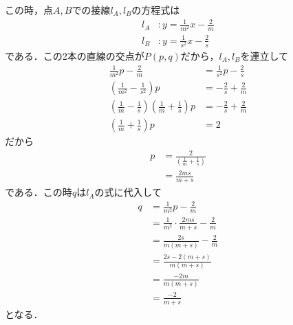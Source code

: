 \documentclass[a4paper,10pt]{ltjsarticle}
\begin{document}
\begin{multicols}{2}
  この時，点$A,B$での接線$l_A,l_B$の方程式は
  \begin{align*}
    l_A & : y = \frac{1}{m^2}x - \frac{2}{m} \\
    l_B & : y = \frac{1}{s^2}x - \frac{2}{s}
  \end{align*}
  である．この2本の直線の交点が$P(p,q)$だから，$l_A, l_B$を連立して
  \begin{align*}
    \frac{1}{m^2}p - \frac{2}{m}                                               & = \frac{1}{s^2}p - \frac{2}{s} \\
    \left(\frac{1}{m^2}-\frac{1}{s^2}\right) p                                 & = -\frac{2}{s} +  \frac{2}{m}  \\
    \left(\frac{1}{m}-\frac{1}{s}\right)\left(\frac{1}{m}+\frac{1}{s}\right) p & = -\frac{2}{s} +  \frac{2}{m}  \\
    \left(\frac{1}{m}+\frac{1}{s}\right) p                                     & = 2
  \end{align*}
  だから
  \begin{align}
    p & = \frac{2}{\left(\frac{1}{m}+\frac{1}{s}\right)} \nonumber \\
      & = \frac{2ms}{m+s} \label{eq:1}
  \end{align}
  である．この時$q$は$l_A$の式に代入して
  \begin{align}
    q
     & = \frac{1}{m^2} p - \frac{2}{m}                     \nonumber   \\
     & = \frac{1}{m^2} \cdot \frac{2ms}{m+s} - \frac{2}{m} \nonumber   \\
     & = \frac{2s}{m(m+s)} - \frac{2}{m}                   \nonumber   \\
     & = \frac{2s - 2(m+s)}{m(m+s)}                        \nonumber   \\
     & = \frac{-2m}{m(m+s)}                                  \nonumber \\
     & = \frac{-2}{m+s} \label{eq:2}
  \end{align}
  となる．


\end{multicols}
\end{document}
